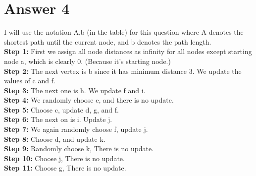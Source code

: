 \documentclass[12pt]{article}
\begin{document}
\section*{Answer 4}
I will use the notation {A,b} (in the table) for this question where A denotes the shortest path until the current node, and b denotes the path length. \\
\textbf{Step 1:} First we assign all node distances as infinity for all nodes except starting node a, which is clearly 0. (Because it's starting node.) \\
\textbf{Step 2:} The next vertex is b since it has minimum distance 3. We update the values of c and f. \\
\textbf{Step 3:} The next one is h. We update f and i. \\
\textbf{Step 4:} We randomly choose e, and there is no update. \\
\textbf{Step 5:} Choose c, update d, g, and f. \\
\textbf{Step 6:} The next on is i. Update j. \\
\textbf{Step 7:} We again randomly choose f, update j. \\
\textbf{Step 8:} Choose d, and update k. \\
\textbf{Step 9:} Randomly choose k, There is no update. \\
\textbf{Step 10:} Choose j, There is no update. \\
\textbf{Step 11:} Choose g, There is no update. \\
\end{document}
